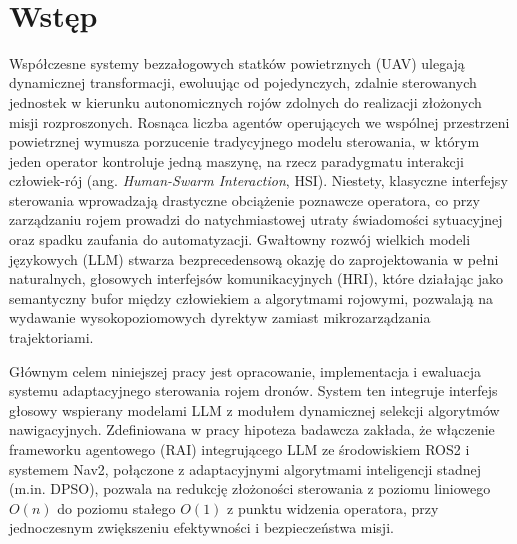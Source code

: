 \documentclass[12pt,a4paper,twoside]{report}
\theoremstyle{definition} %
\begin{document}
\thispagestyle{empty}
~\vfill
\newpage

	\renewcommand{\contentsname}{\LARGE Spis treści}
    \tableofcontents
    \setcounter{tocdepth}{1}
    \cleardoublepage %

\chapter*{Wstęp}

Współczesne systemy bezzałogowych statków powietrznych (UAV) ulegają dynamicznej transformacji, ewoluując od pojedynczych, zdalnie sterowanych jednostek w kierunku autonomicznych rojów zdolnych do realizacji złożonych misji rozproszonych. Rosnąca liczba agentów operujących we wspólnej przestrzeni powietrznej wymusza porzucenie tradycyjnego modelu sterowania, w którym jeden operator kontroluje jedną maszynę, na rzecz paradygmatu interakcji człowiek-rój (ang. \textit{Human-Swarm Interaction}, HSI). Niestety, klasyczne interfejsy sterowania wprowadzają drastyczne obciążenie poznawcze operatora, co przy zarządzaniu rojem prowadzi do natychmiastowej utraty świadomości sytuacyjnej oraz spadku zaufania do automatyzacji. Gwałtowny rozwój wielkich modeli językowych (LLM) stwarza bezprecedensową okazję do zaprojektowania w pełni naturalnych, głosowych interfejsów komunikacyjnych (HRI), które działając jako semantyczny bufor między człowiekiem a algorytmami rojowymi, pozwalają na wydawanie wysokopoziomowych dyrektyw zamiast mikrozarządzania trajektoriami.

Głównym celem niniejszej pracy jest opracowanie, implementacja i ewaluacja systemu adaptacyjnego sterowania rojem dronów. System ten integruje interfejs głosowy wspierany modelami LLM z modułem dynamicznej selekcji algorytmów nawigacyjnych. Zdefiniowana w pracy hipoteza badawcza zakłada, że włączenie frameworku agentowego (RAI) integrującego LLM ze środowiskiem ROS2 i systemem Nav2, połączone z adaptacyjnymi algorytmami inteligencji stadnej (m.in. DPSO), pozwala na redukcję złożoności sterowania z poziomu liniowego $O(n)$ do poziomu stałego $O(1)$ z punktu widzenia operatora, przy jednoczesnym zwiększeniu efektywności i bezpieczeństwa misji.
\end{document}
